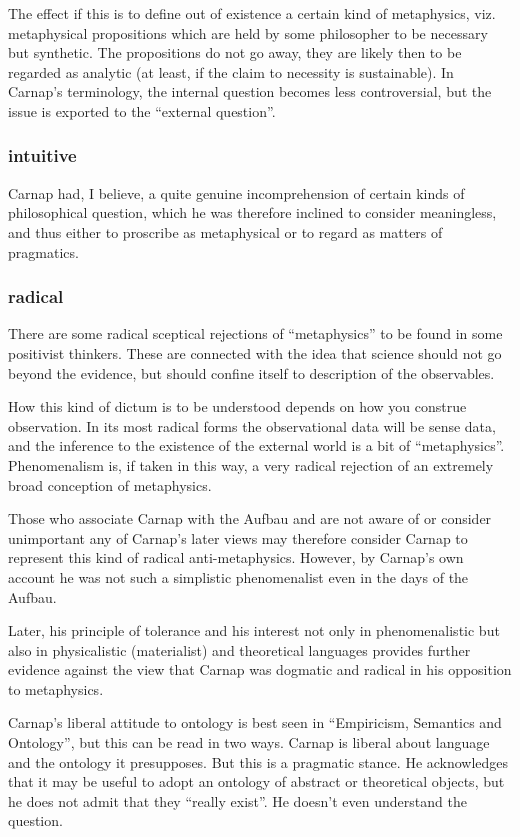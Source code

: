 \documentclass[10pt,titlepage]{book}
\begin{document}
The effect if this is to define out of existence a certain kind of metaphysics, viz. metaphysical propositions which are held by some philosopher to be necessary but synthetic.
The propositions do not go away, they are likely then to be regarded as analytic (at least, if the claim to necessity is sustainable).
In Carnap's terminology, the internal question becomes less controversial, but the issue is exported to the ``external question''.

\subsubsection{intuitive}
Carnap had, I believe, a quite genuine incomprehension of certain kinds of philosophical question, which he was therefore inclined to consider meaningless, and thus either to proscribe as metaphysical or to regard as matters of pragmatics.

\subsubsection{radical}
There are some radical sceptical rejections of ``metaphysics'' to be found in some positivist thinkers.
These are connected with the idea that science should not go beyond the evidence, but should confine itself to description of the observables.

How this kind of dictum is to be understood depends on how you construe observation.
In its most radical forms the observational data will be sense data, and the inference to the existence of the external world is a bit of ``metaphysics''.
Phenomenalism is, if taken in this way, a very radical rejection of an extremely broad conception of metaphysics.

Those who associate Carnap with the Aufbau and are not aware of or consider unimportant any of Carnap's later views may therefore consider Carnap to represent this kind of radical anti-metaphysics.
However, by Carnap's own account he was not such a simplistic phenomenalist even in the days of the Aufbau.

Later, his principle of tolerance and his interest not only in phenomenalistic but also in physicalistic (materialist) and theoretical languages provides further evidence against the view that Carnap was dogmatic and radical in his opposition to metaphysics.

Carnap's liberal attitude to ontology is best seen in ``Empiricism, Semantics and Ontology''\cite{carnap50,carnap56}, but this can be read in two ways.
Carnap is liberal about language and the ontology it presupposes.
But this is a pragmatic stance.
He acknowledges that it may be useful to adopt an ontology of abstract or theoretical objects, but he does not admit that they ``really exist''.
He doesn't even understand the question.
\end{document}

